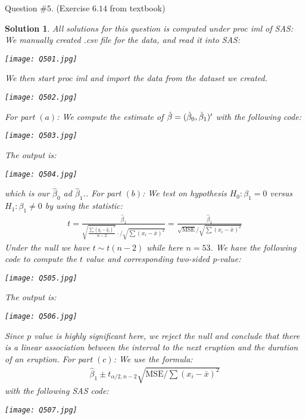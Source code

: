 \documentclass[11pt]{article}
\newtheorem{sol}{Solution}
\begin{document}
Question $\# 5$. (Exercise $6.14$ from textbook)
\begin{sol}
	All solutions for this question is computed under proc iml of SAS:\vskip 2mm
	We manually created .csv file for the data, and read it into SAS:
	\begin{center}
		\texttt{[image: Q501.jpg]}
	\end{center}
	We then start proc iml and import the data from the dataset we created. 
	\begin{center}
		\texttt{[image: Q502.jpg]}
	\end{center}
	For part $(a)$:\vskip 2mm
	We compute the estimate of $\hat{{\bf \beta}} = (\hat{\beta}_0, \hat{\beta}_1)'$ with the following code:
	\begin{center}
		\texttt{[image: Q503.jpg]}
	\end{center}
	The output is:
	\begin{center}
		\texttt{[image: Q504.jpg]}
	\end{center}
	which is our $\hat{\beta}_0$ ad $\hat{\beta}_1$.\vskip 2mm.
	For part $(b)$:\vskip 2mm
	We test on hypothesis $H_0: \beta_1 = 0$ versus $H_1: \beta_1 \neq 0$ by using the statistic:
	\begin{align*}
		t = \frac{\hat{\beta}_1}{\sqrt{\frac{\sum (y_i  -\hat{y}_i)^2}{n - 2}}\cdot /\sqrt{\sum(x_i- \bar{x})^2}} =  \frac{\hat{\beta}_1}{\sqrt{\text{MSE}} /\sqrt{\sum(x_i- \bar{x})^2}}
	\end{align*}
	Under the null we have $t \sim t(n - 2)$ while here $n = 53$.
	We have the following code to compute the $t$ value and corresponding two-sided p-value:
	\begin{center}
		\texttt{[image: Q505.jpg]}
	\end{center}
	The output is:
	\begin{center}
		\texttt{[image: Q506.jpg]}
	\end{center}
	Since $p$ value is highly significant here, we reject the null and conclude that there is a linear association between the interval to the next eruption and the duration of an eruption.\vskip 2mm
	For part $(c)$:\vskip 2mm
	We use the formula:
	\begin{align*}
		\hat{\beta}_1 \pm t_{\alpha/2, n - 2}\sqrt{\text{MSE} /\sum(x_i- \bar{x})^2}
	\end{align*}
	with the following SAS code:
	\begin{center}
		\texttt{[image: Q507.jpg]}
	\end{center}

\end{sol}
\end{document}
